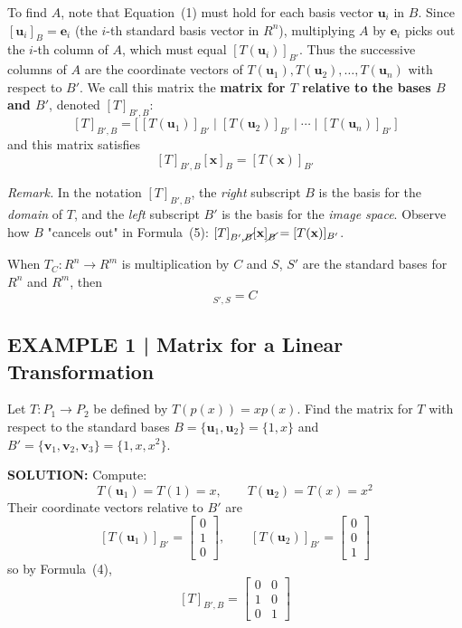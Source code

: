 \documentclass{article}
\begin{document}
To find $A$, note that Equation~(1) must hold for each basis vector $\mathbf{u}_i$ in $B$.
Since $[\mathbf{u}_i]_B = \mathbf{e}_i$ (the $i$-th standard basis vector in $R^n$),
multiplying $A$ by $\mathbf{e}_i$ picks out the $i$-th column of $A$, which must equal
$[T(\mathbf{u}_i)]_{B'}$. Thus the successive columns of $A$ are the coordinate vectors of
$T(\mathbf{u}_1), T(\mathbf{u}_2), \ldots, T(\mathbf{u}_n)$ with respect to $B'$. We call
this matrix the \textbf{matrix for $T$ relative to the bases $B$ and $B'$}, denoted
$[T]_{B',B}$:
\begin{equation}
  \boxed{[T]_{B',B} = \bigl[\,[T(\mathbf{u}_1)]_{B'}\;\big|\;[T(\mathbf{u}_2)]_{B'}\;\big|\;
  \cdots\;\big|\;[T(\mathbf{u}_n)]_{B'}\,\bigr]} \tag{4}
\end{equation}
and this matrix satisfies
\begin{equation}
  \boxed{[T]_{B',B}[\mathbf{x}]_B = [T(\mathbf{x})]_{B'}} \tag{5}
\end{equation}

\textit{Remark.} In the notation $[T]_{B',B}$, the \emph{right} subscript $B$ is the
basis for the \emph{domain} of $T$, and the \emph{left} subscript $B'$ is the basis for
the \emph{image space}. Observe how $B$ "cancels out" in Formula~(5): $[T]_{B',\cancel{B}}
[\mathbf{x}]_{\cancel{B}} = [T(\mathbf{x})]_{B'}$.

When $T_C : R^n \to R^m$ is multiplication by $C$ and $S$, $S'$ are the standard bases
for $R^n$ and $R^m$, then
\begin{equation}
  [T_C]_{S',S} = C \tag{6}
\end{equation}

\subsection*{EXAMPLE 1 | Matrix for a Linear Transformation}

Let $T : P_1 \to P_2$ be defined by $T(p(x)) = xp(x)$. Find the matrix for $T$ with
respect to the standard bases $B = \{\mathbf{u}_1, \mathbf{u}_2\} = \{1, x\}$ and
$B' = \{\mathbf{v}_1, \mathbf{v}_2, \mathbf{v}_3\} = \{1, x, x^2\}$.

\textbf{SOLUTION:} Compute:
\[
  T(\mathbf{u}_1) = T(1) = x, \qquad T(\mathbf{u}_2) = T(x) = x^2
\]
Their coordinate vectors relative to $B'$ are
\[
  [T(\mathbf{u}_1)]_{B'} = \begin{bmatrix}0\\1\\0\end{bmatrix}, \qquad
  [T(\mathbf{u}_2)]_{B'} = \begin{bmatrix}0\\0\\1\end{bmatrix}
\]
so by Formula~(4),
\[
  [T]_{B',B} = \begin{bmatrix}0&0\\1&0\\0&1\end{bmatrix}
\]
\end{document}
